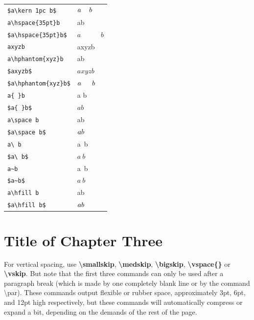 \documentclass[12pt,openright]{book}
\begin{document}
\begin{center}
\begin{longtable}{p{}p{}}
  \verb|$a\kern 1pc b$|          & $a\kern 1pc b$ \\
  \verb|a\hspace{35pt}b|         & a\hspace{35pt}b \\
  \verb|$a\hspace{35pt}b$|       & $a\hspace{35pt}b$ \\
  \verb|axyzb|                   & axyzb \\
  \verb|a\hphantom{xyz}b|        & a\hphantom{xyz}b \\
  \verb|$axyzb$|                 & $axyzb$ \\
  \verb|$a\hphantom{xyz}b$|      & $a\hphantom{xyz}b$ \\
  \verb|a{ }b|                   & a{ }b \\
  \verb|$a{ }b$|                 & $a{ }b$ \\
  \verb|a\space b|               & a\space b \\
  \verb|$a\space b$|             & $a\space b$ \\
  \verb|a\ b|                    & a\ b \\
  \verb|$a\ b$|                  & $a\ b$ \\
  \verb|a~b|                     & a~b \\
  \verb|$a~b$|                   & $a~b$ \\
  \verb|a\hfill b|               & a\hfill b \\
  \verb|$a\hfill b$|             & $a\hfill b$ \\
\end{longtable}
\end{center}

\chapter{Title of Chapter Three}

For vertical spacing, use \textbf{\textbackslash smallskip}, \textbf{\textbackslash medskip}, \textbf{\textbackslash bigskip}, \textbf{\textbackslash vspace\{\}} or \textbf{\textbackslash vskip}. But note that the first three commands can only be used after a paragraph break (which is made by one completely blank line or by the command \textbackslash par). These commands output flexible or rubber space, approximately 3pt, 6pt, and 12pt high respectively, but these commands will automatically compress or expand a bit, depending on the demands of the rest of the page.
\end{document}
